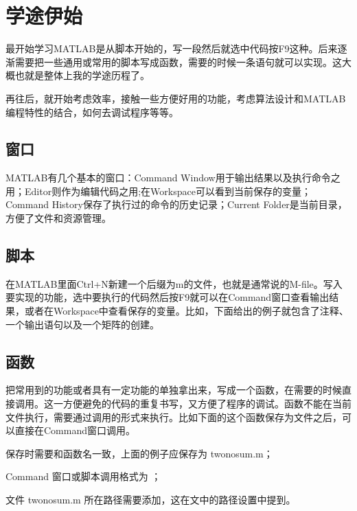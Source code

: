 ﻿\section{学途伊始}
\setcounter{page}{1}

最开始学习MATLAB是从脚本开始的，写一段然后就选中代码按F9这种。后来逐渐需要把一些通用或常用的脚本写成函数，需要的时候一条语句就可以实现。这大概也就是整体上我的学途历程了。\par

再往后，就开始考虑效率，接触一些方便好用的功能，考虑算法设计和MATLAB编程特性的结合，如何去调试程序等等。





\subsection{窗口}

MATLAB有几个基本的窗口：Command Window用于输出结果以及执行命令之用；Editor则作为编辑代码之用;在Workspace可以看到当前保存的变量；Command History保存了执行过的命令的历史记录；Current Folder是当前目录，方便了文件和资源管理。





\subsection{脚本}

在MATLAB里面Ctrl+N新建一个后缀为m的文件，也就是通常说的M-file。写入要实现的功能，选中要执行的代码然后按F9就可以在Command窗口查看输出结果，或者在Workspace中查看保存的变量。比如，下面给出的例子就包含了注释、一个输出语句以及一个矩阵的创建。

\vspace{-0.8cm}







\subsection{函数}

把常用到的功能或者具有一定功能的单独拿出来，写成一个函数，在需要的时候直接调用。这一方便避免的代码的重复书写，又方便了程序的调试。函数不能在当前文件执行，需要通过调用的形式来执行。比如下面的这个函数保存为文件之后，可以直接在Command窗口调用。

\vspace{-0.8cm}


\begindot
  \item 保存时需要和函数名一致，上面的例子应保存为 twonosum.m；
  \item Command 窗口或脚本调用格式为 ；
  \item 文件 twonosum.m 所在路径需要添加，这在文中的路径设置中提到。
\myenddot

